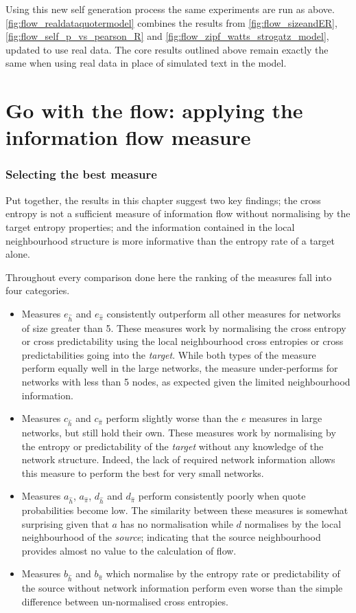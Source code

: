 Using this new self generation process the same experiments are run as above. \autoref{fig:flow_realdataquotermodel} combines the results from \autoref{fig:flow_sizeandER}, \autoref{fig:flow_self_p_vs_pearson_R} and \autoref{fig:flow_zipf_watts_strogatz_model}, updated to use real data. The core results outlined above remain exactly the same when using real data in place of simulated text in the model. 


\section{Go with the flow: applying the information flow measure}\label{sec:gowiththeflow}
\subsubsection{Selecting the best measure}
Put together, the results in this chapter suggest two key findings; the cross entropy is not a sufficient measure of information flow without normalising by the target entropy properties; and the information contained in the local neighbourhood structure is more informative than the entropy rate of a target alone.

Throughout every comparison done here the ranking of the measures fall into four categories.
\begin{itemize}
\item Measures $e_{\hat{h}}$ and $e_{\hat{\pi}}$ consistently outperform all other measures for networks of size greater than 5. These measures work by normalising the cross entropy or cross predictability using the local neighbourhood cross entropies or cross predictabilities going into the \emph{target}. While both types of the measure perform equally well in the large networks, the measure under-performs for networks with less than 5 nodes, as expected given the limited neighbourhood information.

\item Measures $c_{\hat{h}}$ and $c_{\hat{\pi}}$ perform slightly worse than the $e$ measures in large networks, but still hold their own. These measures work by normalising by the entropy or predictability of the \emph{target} without any knowledge of the network structure. Indeed, the lack of required network information allows this measure to perform the best for very small networks.

\item Measures $a_{\hat{h}}$,  $a_{\hat{\pi}}$, $d_{\hat{h}}$ and $d_{\hat{\pi}}$ perform consistently poorly when quote probabilities become low. The similarity between these measures is somewhat surprising given that $a$ has no normalisation while $d$ normalises by the local neighbourhood of the \emph{source}; indicating that the source neighbourhood provides almost no value to the calculation of flow.

\item Measures $b_{\hat{h}}$ and $b_{\hat{\pi}}$ which normalise by the entropy rate or predictability of the source without network information perform even worse than the simple difference between un-normalised cross entropies. 
\end{itemize}


